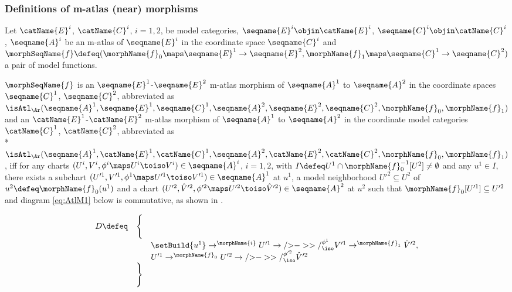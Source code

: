 \documentclass{article}
\begin{document}
\subsubsection{Definitions of m-atlas (near) morphisms}
\begin{definition}
\label{def:M-ATLmorph}
Let $\catName{E}^i$, $\catName{C}^i$, $i=1,2$, be model categories,
$\seqname{E}^i \objin \catName{E}^i$,
$\seqname{C}^i \objin \catName{C}^i$, $\seqname{A}^i$ be an m-atlas of
$\seqname{E}^i$ in the coordinate space $\seqname{C}^i$ and
$
  \morphSeqName{f} \defeq
  (
    \morphName{f}_0 \maps \seqname{E}^1 \to \seqname{E}^2,
    \morphName{f}_1 \maps \seqname{C}^1 \to \seqname{C}^2
  )
$
a pair of model functions.

$\morphSeqName{f}$ is an
$\seqname{E}^1$-$\seqname{E}^2$ m-atlas morphism of $\seqname{A}^1$ to
$\seqname{A}^2$ in the coordinate spaces $\seqname{C}^1$,
$\seqname{C}^2$, abbreviated as
$
  \isAtl_\Ar
    (
      \seqname{A}^1,
      \seqname{E}^1,
      \seqname{C}^1,
      \seqname{A}^2,
      \seqname{E}^2,
      \seqname{C}^2,
      \morphName{f}_0,
      \morphName{f}_1
    )
$
and an $\catName{E}^1$-$\catName{E}^2$ m-atlas morphism of
$\seqname{A}^1$ to $\seqname{A}^2$ in the coordinate model categories
$\catName{C}^1$, $\catName{C}^2$, abbreviated as \\*
$
  \isAtl_\Ar
  (
    \seqname{A}^1,
    \catName{E}^1,
    \catName{C}^1,
    \seqname{A}^2,
    \catName{E}^2,
    \catName{C}^2,
    \morphName{f}_0,
    \morphName{f}_1
  )
$,
iff for any charts
$(U^i, V^i, \phi^i \maps U^i \toiso V^i) \in \seqname{A}^i$, $i=1,2$,
with $I \defeq U^1 \cap \morphName{f}^{-1}_0[U^2] \neq \emptyset$ and any
$u^1 \in I$, there exists a subchart
$
  (U'^1, V'^1, \phi^1 \maps U'^1 \toiso V'^1)
  \in \seqname{A}^1
$
at $u^1$, a model neighborhood $U'^2 \subseteq U^2$ of
$u^2 \defeq \morphName{f}_0(u^1)$ and a chart
$
  (U'^2 ,\hat{V}'^2, \phi'^2 \maps U'^2 \toiso \hat{V}'^2)
  \in \seqname{A}^2
$
at $u^2$ such that
$\morphName{f}_0[U'^1] \subseteq U'^2$ and diagram \eqref{eq:AtlM1}
below is commutative, as shown in .

\begin{equation}
\begin{array}{lll}
\label{eq:AtlM1}
D \defeq & \Biggl \{
\\
  &&
  \setBuild{u^1} \to^{\morphName{i}} U'^1
  \to/{>}->>/^{\phi^1}_\iso V'^1
  \to^{\morphName{f}_1} \hat{V}'^2,
\\
  &&
  U'^1 \to^{\morphName{f}_0}  U'^2 \to/{>}->>/^{\phi'^2}_\iso \hat{V}'^2
\\
& \Biggr \}
\end{array}
\end{equation}


\end{definition}
\end{document}
